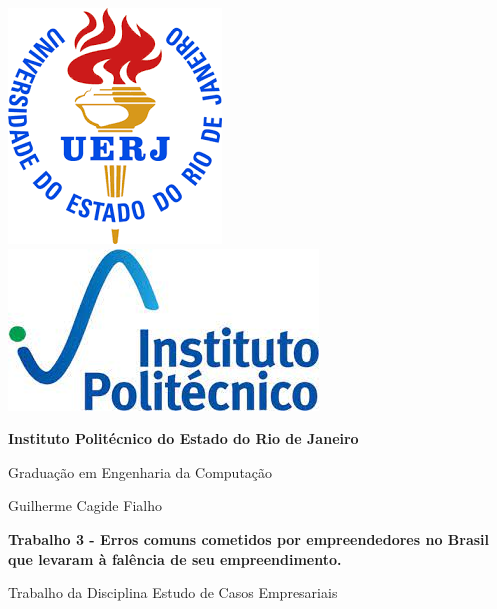 \begin{titlepage}
    \centering

    \includegraphics[height=0.151\textwidth]{header/contra-capa/assets/uerj.png}\hfill
    \includegraphics[height=0.15\textwidth]{header/contra-capa/assets/iprj.jpeg}\hfill

    \vspace{2cm} %

    {\Large\bfseries Instituto Politécnico do Estado do Rio de Janeiro \par}
    \vspace{0.5cm}
    {\large Graduação em Engenharia da Computação \par}

    \vspace{3cm} %

    {\large Guilherme Cagide Fialho \par}

    \vspace{1.5cm}

    {\large\bfseries Trabalho 3 - Erros comuns cometidos por empreendedores no Brasil que levaram à falência de seu empreendimento. \par}

    \vspace{1cm} %

    \begin{flushright}
        \begin{minipage}{0.5\textwidth}
            \large
            \raggedleft %
            Trabalho da Disciplina Estudo de Casos Empresariais
        \end{minipage}
    \end{flushright}


\end{titlepage}
